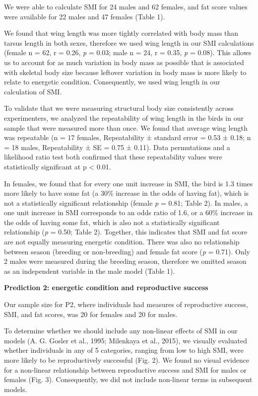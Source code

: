 \documentclass[
]{article}
\begin{document}
We were able to calculate SMI for 24 males and 62 females, and fat score
values were available for 22 males and 47 females (Table 1).

We found that wing length was more tightly correlated with body mass
than tarsus length in both sexes, therefore we used wing length in our
SMI calculations (female n = 62, r = 0.26, \emph{p} = 0.03; male n = 24,
r = 0.35, \emph{p} = 0.08). This allows us to account for as much
variation in body mass as possible that is associated with skeletal body
size because leftover variation in body mass is more likely to relate to
energetic condition. Consequently, we used wing length in our
calculation of SMI.

To validate that we were measuring structural body size consistently
across experimenters, we analyzed the repeatability of wing length in
the birds in our sample that were measured more than once. We found that
average wing length was repeatable (n = 17 females, Repeatability ±
standard error = 0.53 ± 0.18; n = 18 males, Repeatability ± SE = 0.75 ±
0.11). Data permutations and a likelihood ratio test both confirmed that
these repeatability values were statistically significant at p
\textless{} 0.01.

In females, we found that for every one unit increase in SMI, the bird
is 1.3 times more likely to have some fat (a 30\% increase in the odds
of having fat), which is not a statistically significant relationship
(female \emph{p} = 0.81; Table 2). In males, a one unit increase in SMI
corresponds to an odds ratio of 1.6, or a 60\% increase in the odds of
having some fat, which is also not a statistically significant
relationship (\emph{p} = 0.50; Table 2). Together, this indicates that
SMI and fat score are not equally measuring energetic condition. There
was also no relationship between season (breeding or non-breeding) and
female fat score (\emph{p} = 0.71). Only 2 males were measured during
the breeding season, therefore we omitted season as an independent
variable in the male model (Table 1).

\textbf{Prediction 2: energetic condition and reproductive success}

Our sample size for P2, where individuals had measures of reproductive
success, SMI, and fat scores, was 20 for females and 20 for males.

To determine whether we should include any non-linear effects of SMI in
our models (A. G. Gosler et al., 1995; Milenkaya et al., 2015), we
visually evaluated whether individuals in any of 5 categories, ranging
from low to high SMI, were more likely to be reproductively successful
(Fig. 2). We found no visual evidence for a non-linear relationship
between reproductive success and SMI for males or females (Fig. 3).
Consequently, we did not include non-linear terms in subsequent models.
\end{document}
